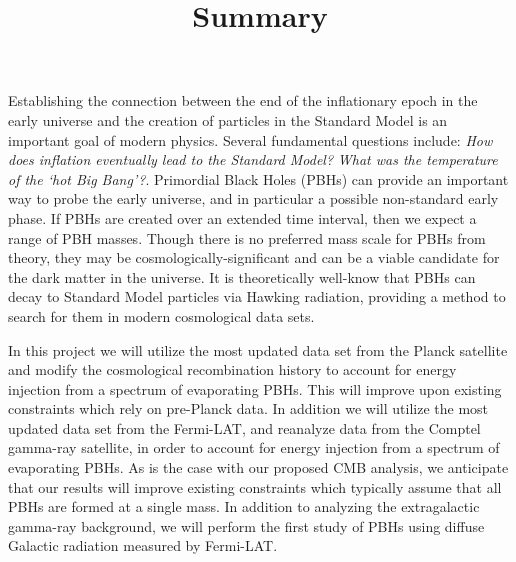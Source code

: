 \documentclass[useAMS,usenatbib,a4paper,12pt]{article}
\date{}
\begin{document}
\title{Summary}
\maketitle

Establishing the connection between the end of the inflationary epoch in the early universe and the creation of particles in the Standard Model is an important goal of modern physics. Several fundamental questions include: {\it How does inflation eventually lead to the Standard Model?}  {\it What was the temperature of the `hot Big Bang'?}. Primordial Black Holes (PBHs) can provide an important way to probe the early universe, and in particular a possible non-standard early phase. If PBHs are created over an extended time interval, then we expect a range of PBH masses. Though there is no preferred mass scale for PBHs from theory, they may be cosmologically-significant and can be a viable candidate for the dark matter in the universe. It is theoretically well-know that PBHs can decay to Standard Model particles via Hawking radiation, providing a method to search for them in modern cosmological data sets. 

In this project we will utilize the most updated data set from the Planck satellite and modify the cosmological recombination history to account for energy injection from a spectrum of evaporating PBHs. This will improve upon existing constraints which rely on pre-Planck data. In addition we will  utilize the most updated data set from the Fermi-LAT, and reanalyze data from the Comptel gamma-ray satellite, in order to account for energy injection from a spectrum of evaporating PBHs. As is the case with our proposed CMB analysis, we anticipate that our results will improve existing constraints which typically assume that all PBHs are formed at a single mass. In addition to analyzing the extragalactic gamma-ray background, we will perform the first study of PBHs using diffuse Galactic radiation measured by Fermi-LAT.  
\end{document}
